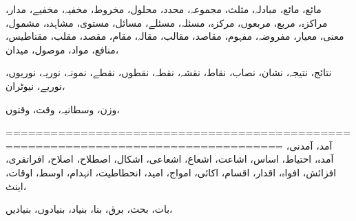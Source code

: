                                                                                                                                                                                     مائع،            مائع،            مبادلہ،            مثلث،            مجموعہ،            محدد،            محلول،            مخروط،            مخفیہ،            مخفیے،            مدار،            مراکزہ،            مربع،            مربعوں،            مرکزہ،            مسئلہ،            مسئلے،            مسائل،            مستوی،            مشاہدہ،            مشمول،            معنی،            معیار،            مفروضہ،            مفہوم،            مقاصد،            مقالب،            مقالہ،            مقام،            مقصد،            مقلب،            مقناطیس،            منافع،            مواد،            موصول،            میدان،            
                                                                                                                                                                                    
                                                                                                                                                                                    نتائج،            نتیجہ،            نشان،            نصاب،            نقاط،            نقشہ،            نقطہ،            نقطوں،            نقطے،            نمونہ،            نوریہ،            نوریوں،            نوریے،            نیوٹران،
                                                                                                                                                                                    
                                                                                                                                                                                                وزن،            وسطانیہ،            وقت،            وقتوں،   

=================================================================================== 
                         آمد،            آمدنی،            آمدہ،            احتیاط،            اساس،            اشاعت،            اشعاع،            اشعاعی،            اشکال،            اصطلاح،            اصلاح،            افراتفری،            افزائش،            افواہ،            اقدار،            اقسام،            اکائی،            امواج،            امید،            انحطاطیت،            انہدام،            اوسط،            اوقات،            اینٹ،            
                         
                         بات،            بحث،            برق،            بنا،            بنیاد،            بنیادوں،            بنیادیں،
                         
